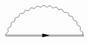 \[\begin{aligned}
\begin{gathered}
\begin{tikzpicture}[x=0.75pt,y=0.75pt,yscale=-1,xscale=1]
                \draw    (274,238) -- (397.71,238) ;
                \draw    (344,238.62) ;
                \draw [shift={(344,238.62)}, rotate = 180] [fill={rgb, 255:red, 0; green, 0; blue, 0 }  ][line width=0.08]  [draw opacity=0] (12,-3) -- (0,0) -- (12,3) -- cycle    ;
                \draw    (274.74,239.78) -- (398.44,239.78) ;
                \draw    (274,240) .. controls (272.94,237.69) and (273.5,235.91) .. (275.68,234.65) .. controls (277.88,233.56) and (278.44,232.15) .. (277.35,230.42) .. controls (276.59,228.07) and (277.36,226.47) .. (279.66,225.62) .. controls (281.95,224.93) and (282.82,223.43) .. (282.27,221.12) .. controls (281.84,218.75) and (282.81,217.35) .. (285.17,216.92) .. controls (287.5,216.65) and (288.55,215.36) .. (288.34,213.03) .. controls (288.25,210.66) and (289.39,209.47) .. (291.75,209.46) .. controls (294.06,209.59) and (295.27,208.5) .. (295.39,206.2) .. controls (295.64,203.87) and (296.92,202.88) .. (299.23,203.25) .. controls (301.46,203.75) and (302.8,202.88) .. (303.24,200.63) .. controls (303.82,198.38) and (305.21,197.61) .. (307.42,198.34) .. controls (310,198.96) and (311.68,198.2) .. (312.47,196.07) .. controls (313.39,193.94) and (314.87,193.42) .. (316.92,194.49) .. controls (318.87,195.66) and (320.38,195.24) .. (321.46,193.25) .. controls (323.21,191.18) and (325,190.84) .. (326.85,192.23) .. controls (328.58,193.69) and (330.14,193.52) .. (331.52,191.72) .. controls (333.03,189.97) and (334.85,189.92) .. (337,191.57) .. controls (338.48,193.29) and (340.05,193.37) .. (341.7,191.82) .. controls (343.47,190.34) and (345.03,190.54) .. (346.37,192.43) .. controls (348.08,194.46) and (349.88,194.84) .. (351.77,193.59) .. controls (353.78,192.42) and (355.3,192.88) .. (356.33,194.97) .. controls (357.22,197.08) and (358.71,197.66) .. (360.8,196.72) .. controls (362.99,195.9) and (364.45,196.61) .. (365.16,198.84) .. controls (366.19,201.35) and (367.83,202.33) .. (370.08,201.78) .. controls (372.42,201.37) and (373.77,202.35) .. (374.13,204.71) .. controls (374.35,207.05) and (375.43,207.96) .. (377.36,207.44) .. controls (379.78,207.43) and (381.02,208.63) .. (381.07,211.06) .. controls (381,213.46) and (382.16,214.8) .. (384.56,215.07) .. controls (387.01,215.52) and (387.92,216.73) .. (387.29,218.71) .. controls (386.92,221.16) and (387.94,222.73) .. (390.33,223.44) .. controls (392.42,223.74) and (393.2,225.15) .. (392.65,227.68) .. controls (392,230.16) and (392.71,231.66) .. (394.77,232.19) .. controls (396.84,232.82) and (397.48,234.42) .. (396.67,236.99) -- (397.71,240) ;
                

\end{tikzpicture}
\end{gathered}
\end{aligned}\]
